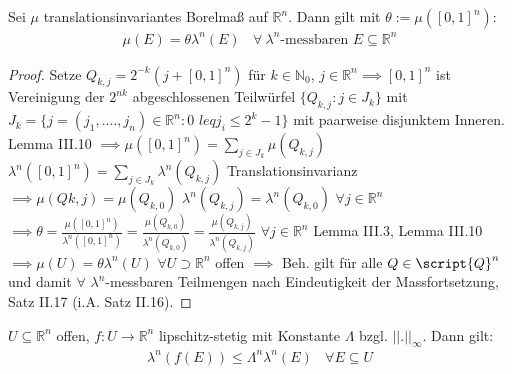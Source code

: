   \begin{theorem}
    Sei $\mu$ translationsinvariantes Borelmaß auf $\mathbb{R}^n$. Dann gilt mit $\theta := \mu([0,1]^n)$:
    \begin{align*}
      \mu(E) = \theta \lambda^n(E) \ \ \ \ \forall \ \lambda^n \text{-messbaren } E \subseteq \mathbb{R}^n
    \end{align*}
  \end{theorem}

    \begin{proof}
	Setze $Q_{k,j} = 2^{-k}(j+[0,1]^n)$ für $k\in\mathbb{N}_0$, $j\in\mathbb{R}^n \implies [0,1]^n$ ist Vereinigung der $2^{nk}$ abgeschlossenen Teilwürfel $\{Q_{k,j}: j\in J_k\}$ mit $J_k = \{j = (j_1, ...., j_n) \in \mathbb{R}^n: 0$ $leq j_i \leq 2^k-1\}$ mit paarweise disjunktem Inneren. Lemma III.10 \newline  $\implies \mu([0,1]^n) = \sum\limits_{j\in J_k} \mu(Q_{k,j})$ \newline
	$\lambda^n([0,1]^n) = \sum\limits_{j\in J_k} \lambda^n(Q_{k,j})$ \newline
	Translationsinvarianz $\implies \mu(Q{k,j}) = \mu(Q_{k,0})$ \newline
	$\lambda^n(Q_{k,j}) = \lambda^n(Q_{k,0})$ $\forall  j\in \mathbb{R}^n$ \newline
	$\implies \theta = \frac{\mu([0,1]^n)}{\lambda^n([0,1]^n)} = \frac{\mu(Q_{k,0})}{\lambda^n(Q_{k,0})} = \frac{\mu(Q_{k,j})}{\lambda^n(Q_{k,j})}$ $\forall j\in \mathbb{R}^n$ \newline
	Lemma III.3, Lemma III.10 $\implies \mu(U) = \theta \lambda^n(U)$ $\forall U\supset \mathbb{R}^n$ offen \newline
	$\implies$ Beh. gilt für alle $Q \in \script{Q}^n$ und damit $\forall$ $\lambda^n$-messbaren Teilmengen nach Eindeutigkeit der Massfortsetzung, Satz II.17 (i.A. Satz II.16). 
\end{proof}

  \begin{lemma}
    $U \subseteq \mathbb{R}^n$ offen, $f: U \to \mathbb{R}^n$ lipschitz-stetig mit Konstante $\Lambda$ bzgl. $||.||_{\infty}$. Dann gilt:
    \begin{align*}
      \lambda^n(f(E)) \leq \Lambda^n \lambda^n(E) \ \ \ \ \forall E \subseteq U
    \end{align*}
  \end{lemma}

